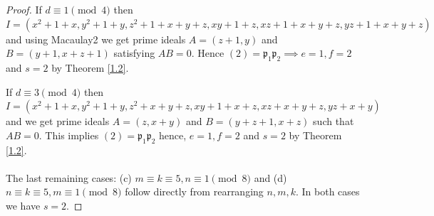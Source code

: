 \documentclass[10pt,a4paper]{amsart}
\begin{document}
\begin{proof}
If $d \equiv 1 \pmod{4}$ then $I = (x^2+1+x,y^2+1+y,z^2+1+x+y+z,xy+1+z,xz+1+x+y+z,yz+1+x+y+z)$ and using Macaulay2 we get prime ideals $A=(z+1,y)$ and $B = (y+1,x+z+1)$ satisfying $AB = 0$. Hence $  (2) = \mathfrak{p}_1\mathfrak{p}_2 \implies e=1,f=2$ and $s=2$ by Theorem \ref{1.2}.

If $d \equiv 3 \pmod{4}$ then $I = (x^2+1+x,y^2+1+y,z^2+x+y+z,xy+1+x+z,xz+x+y+z,yz+x+y) $ and we get prime ideals $A = (z,x+y)$ and $B = (y+z+1,x+z)$ such that $AB = 0$. This implies $ (2) = \mathfrak{p}_1\mathfrak{p}_2 $ hence, $ e=1,f=2$ and $ s=2$ by Theorem \ref{1.2}.
\\ \\
The last remaining cases: (c) $m \equiv k \equiv 5, n \equiv 1 \pmod{8}$ and (d) $n \equiv k \equiv 5, m \equiv 1 \pmod{8}$ follow directly from rearranging $n,m,k$. In both cases we have $s=2$.

\end{proof}
\end{document}
